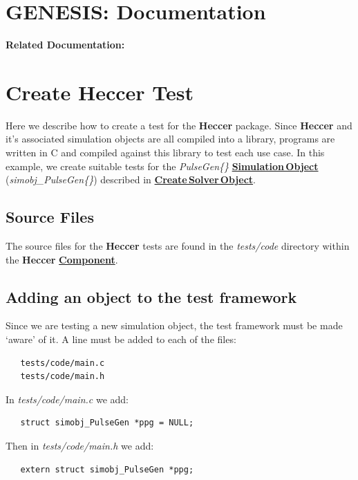 \documentclass[12pt]{article}
\begin{document}
\section*{GENESIS: Documentation}

{\bf Related Documentation:}

\section*{Create Heccer Test}

Here we describe how to create a test for the {\bf Heccer} package. Since {\bf Heccer} and it's associated simulation objects are all compiled into a library, programs are written in C and compiled against this library to test each use case. In this example, we create suitable tests for the {\it PulseGen\{\}} \href{../simulation-objects/simulation-objects.tex}{\bf Simulation\,Object} ({\it simobj\_PulseGen\{\}}) described in \href{../genesis-add-object-solver/genesis-add-object-solver.tex}{\bf Create\,Solver\,Object}.

\subsection*{Source Files}

The source files for the {\bf Heccer} tests are found in the {\it tests/code} directory within the {\bf Heccer} \href{../reserved-words/reserved-words.tex}{\bf Component}.

\subsection*{Adding an object to the test framework}

Since we are testing a new simulation object, the test framework must be made `aware' of it. A line must be added to each of the files:
\begin{verbatim}
   tests/code/main.c
   tests/code/main.h
\end{verbatim}

In {\it tests/code/main.c} we add:

\begin{verbatim}
   struct simobj_PulseGen *ppg = NULL;
\end{verbatim}

Then in {\it tests/code/main.h} we add:

\begin{verbatim}
   extern struct simobj_PulseGen *ppg;
\end{verbatim}
\end{document}

